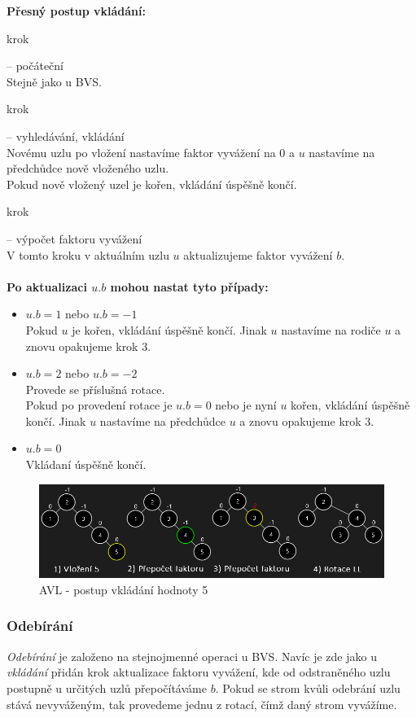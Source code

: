 \documentclass[
  biblatex=false,
  font=serif,
  glossaries=false,
  tables=false,
  theorems=false,
  index
]{kidiplom}
\begin{document}
\newpage
\noindent \textbf{Přesný postup vkládání:}
\begin{enumerate} {\bfseries
\item  krok} -- počáteční \\
Stejně jako u BVS.
{\bfseries\item  krok} -- vyhledávání, vkládání \\
Novému uzlu po vložení nastavíme faktor vyvážení na 0 a $u$ nastavíme na předchůdce nově vloženého uzlu.\\
Pokud nově vložený uzel je kořen, vkládání úspěšně končí.
{\bfseries\item  krok} -- výpočet faktoru vyvážení \\
V tomto kroku v aktuálním uzlu $u$ aktualizujeme faktor vyvážení $b$.\\\\
\textbf{Po aktualizaci $u.b$ mohou nastat tyto případy:}
\begin{itemize}
\item $u.b = 1$ nebo $u.b = -1$\\
Pokud $u$ je kořen, vkládání úspěšně končí. Jinak $u$ nastavíme na rodiče $u$ a znovu opakujeme krok 3.
\item $u.b = 2$ nebo $u.b = -2$\\
Provede se příslušná rotace.\\
Pokud po provedení rotace je $u.b = 0$ nebo je nyní $u$ kořen, vkládání úspěšně končí. Jinak $u$ nastavíme na předchůdce $u$ a znovu opakujeme krok 3.
\item $u.b = 0$\\
Vkládaní úspěšně končí.
\end{itemize}
\end{enumerate}

\begin{figure}[h!]
\centering
	\includegraphics[scale=0.55]{obrazky/15AVLVlozeni.png}
	\caption{AVL - postup vkládání hodnoty 5}
\end{figure}

\subsubsection{Odebírání}
\indent\indent \textit{Odebírání} je založeno na stejnojmenné operaci u BVS. Navíc je zde jako u \textit{vkládání} přidán krok aktualizace faktoru vyvážení, kde od odstraněného uzlu postupně u určitých uzlů přepočítáváme $b$. Pokud se strom kvůli odebrání uzlu stává nevyváženým, tak provedeme jednu z rotací, čímž daný strom vyvážíme. 
\end{document}
